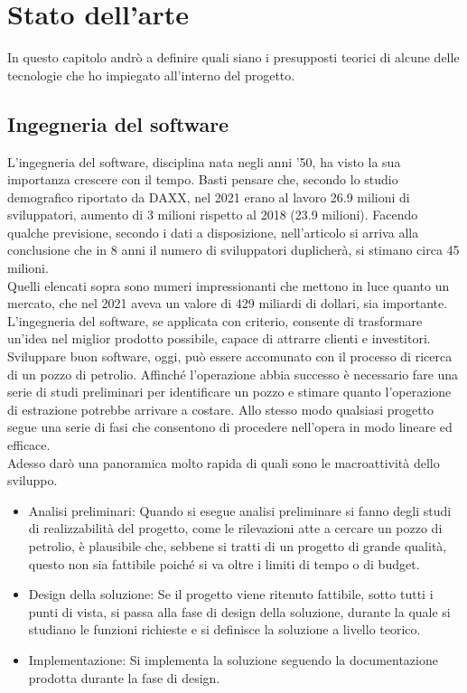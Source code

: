 \chapter{Stato dell'arte}
In questo capitolo andrò a definire quali siano i presupposti teorici di alcune delle tecnologie che ho impiegato all'interno del progetto.



\section{Ingegneria del software}
L'ingegneria del software, disciplina nata negli anni '50, ha visto la sua importanza crescere con il tempo. Basti pensare che, secondo lo studio demografico riportato da DAXX\cite{SoftwareEngineersNumbers}, nel 2021 erano al lavoro 26.9 milioni di sviluppatori, aumento di 3 milioni rispetto al 2018 (23.9 milioni). Facendo qualche previsione, secondo i dati a disposizione, nell'articolo si arriva alla conclusione che in 8 anni il numero di sviluppatori duplicherà, si stimano circa 45 milioni.
\\
Quelli elencati sopra sono numeri impressionanti che mettono in luce quanto un mercato, che nel 2021 aveva un valore di 429 miliardi di dollari\cite{SoftwareMarketShare}, sia importante. L'ingegneria del software, se applicata con criterio, consente di trasformare un'idea nel miglior prodotto possibile, capace di attrarre clienti e investitori.
\\
Sviluppare buon software, oggi, può essere accomunato con il processo di ricerca di un pozzo di petrolio.\cite{Larman2016} Affinché l'operazione abbia successo è necessario fare una serie di studi preliminari per identificare un pozzo e stimare quanto l'operazione di estrazione potrebbe arrivare a costare. Allo stesso modo qualsiasi progetto segue una serie di fasi che consentono di procedere nell'opera in modo lineare ed efficace.
\\
Adesso darò una panoramica molto rapida di quali sono le macroattività dello sviluppo.
\begin{itemize}
    \item Analisi preliminari: Quando si esegue analisi preliminare si fanno degli studi di realizzabilità del progetto, come le rilevazioni atte a cercare un pozzo di petrolio, è plausibile che, sebbene si tratti di un progetto di grande qualità, questo non sia fattibile poiché si va oltre i limiti di tempo o di budget.
    \item Design della soluzione: Se il progetto viene ritenuto fattibile, sotto tutti i punti di vista, si passa alla fase di design della soluzione, durante la quale si studiano le funzioni richieste e si definisce la soluzione a livello teorico.
    \item Implementazione: Si implementa la soluzione seguendo la documentazione prodotta durante la fase di design.
\end{itemize}
